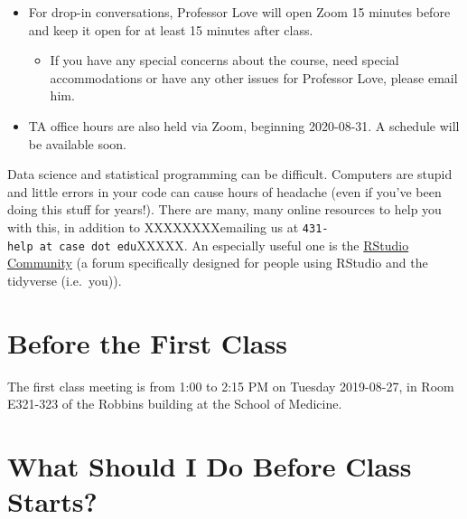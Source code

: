 \documentclass[
]{book}
\providecommand{\tightlist}{%
  \setlength{\itemsep}{0pt}\setlength{\parskip}{0pt}}
\begin{document}
\begin{itemize}
\tightlist
\item
  For drop-in conversations, Professor Love will open Zoom 15 minutes before and keep it open for at least 15 minutes after class.

  \begin{itemize}
  \tightlist
  \item
    If you have any special concerns about the course, need special accommodations or have any other issues for Professor Love, please email him.
  \end{itemize}
\item
  TA office hours are also held via Zoom, beginning 2020-08-31. A schedule will be available soon.
\end{itemize}

Data science and statistical programming can be difficult. Computers are stupid and little errors in your code can cause hours of headache (even if you've been doing this stuff for years!). There are many, many online resources to help you with this, in addition to XXXXXXXXemailing us at \texttt{431-help\ at\ case\ dot\ edu}XXXXX. An especially useful one is the \href{https://community.rstudio.com/}{RStudio Community} (a forum specifically designed for people using RStudio and the tidyverse (i.e.~you)).

\hypertarget{before-the-first-class}{%
\section*{Before the First Class}\label{before-the-first-class}}

The first class meeting is from 1:00 to 2:15 PM on Tuesday 2019-08-27, in Room E321-323 of the Robbins building at the School of Medicine.

\hypertarget{what-should-i-do-before-class-starts}{%
\section{What Should I Do Before Class Starts?}\label{what-should-i-do-before-class-starts}}
\end{document}
